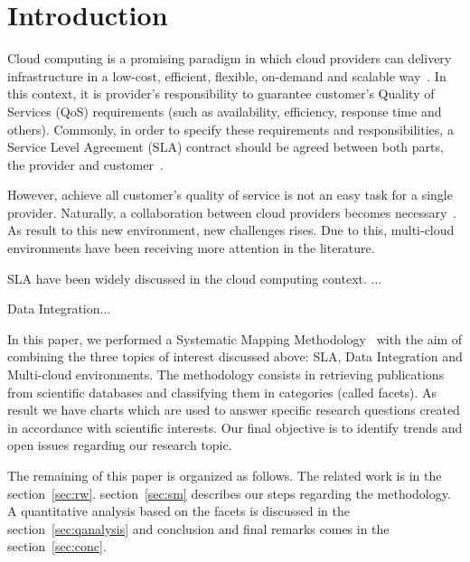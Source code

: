 \section{Introduction}
\label{sec:intro}

Cloud computing is a promising paradigm in which cloud providers can delivery infrastructure in 
a low-cost, efficient, flexible, on-demand and scalable way~\cite{014}.
In this context, it is provider's responsibility to guarantee customer's Quality
of Services (QoS) requirements (such as availability, efficiency, response time
and others).
Commonly, in order to specify these requirements and responsibilities, a Service
Level Agreement (SLA) contract should be agreed between both parts, the provider and customer~\cite{011}.

However, achieve all customer's quality of service is not an easy task for a single provider.
Naturally, a collaboration between cloud providers becomes necessary~\cite{036}.
As result to this new environment, new challenges rises.
Due to this, multi-cloud environments have been receiving more attention in the literature.

SLA have been widely discussed in the cloud computing context. ...

Data Integration...

In this paper, we performed a Systematic Mapping Methodology~\cite{SM:Petersen:2008} with the aim of
combining the three topics of interest discussed above: SLA, Data Integration and Multi-cloud environments.
The methodology consists in retrieving publications from scientific databases and classifying them in
categories (called facets). As result we have charts which are used to answer specific research questions
created in accordance with scientific interests. 
Our final objective is to identify trends and open issues regarding our research topic.

The remaining of this paper is organized as follows. 
The related work is in the section~\ref{sec:rw}. 
section~\ref{sec:sm} describes our steps regarding the methodology.
A quantitative analysis based on the facets is discussed in the section~\ref{sec:qanalysis} and conclusion and final
remarks comes in the section~\ref{sec:conc}. 